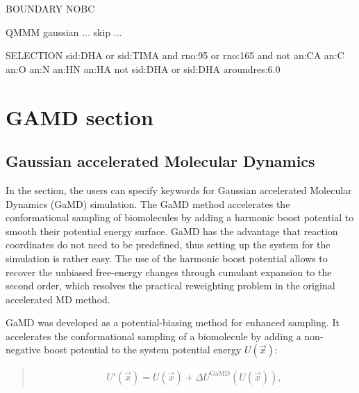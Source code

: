\documentclass[a4paper,11pt,oneside,english]{sphinxmanual}
\begin{document}
\begin{sphinxVerbatim}[commandchars=\\\{\}]
\PYG{o}{[}BOUNDARY\PYG{o}{]}
           NOBC

\PYG{o}{[}QMMM\PYG{o}{]}
               gaussian
  
... skip ...

\PYG{o}{[}SELECTION\PYG{o}{]}
  sid:DHA or sid:TIMA and rno:95 or rno:165 and 
         not an:CA  an:C  an:O  an:N  an:HN  an:HA
  not sid:DHA  or sid:DHA  around\PYGZus{}res:6.0
\end{sphinxVerbatim}


\chapter{GAMD section}
\label{\detokenize{16_GaMD:gamd-section}}\label{\detokenize{16_GaMD:gamd}}\label{\detokenize{16_GaMD::doc}}

\section{Gaussian accelerated Molecular Dynamics}
\label{\detokenize{16_GaMD:gaussian-accelerated-molecular-dynamics}}
In the \sphinxstylestrong{{[}GAMD{]}} section, the users can specify keywords for Gaussian
accelerated Molecular Dynamics (GaMD) simulation.
The GaMD method
accelerates the conformational sampling of biomolecules by adding
a harmonic boost potential to smooth their potential energy surface.
GaMD has the advantage that reaction coordinates do not need to be predefined,
thus setting up the system for the simulation is rather easy.
The use of the harmonic boost potential allows to recover the
unbiased free-energy changes through cumulant expansion to the second order,
which resolves the practical reweighting problem in the original accelerated MD method.

GaMD was developed as a potential-biasing method for enhanced sampling.
It accelerates the conformational sampling of a biomolecule by adding a
non-negative boost potential to the system potential energy \(U(\vec{x})\):
\begin{quote}

\vspace{-5mm}
\begin{equation*}
\begin{split}U'(\vec{x}) = U(\vec{x}) + \Delta U^{\mathrm{GaMD}}\left(U(\vec{x})\right),\end{split}
\end{equation*}
\vspace{-3mm}
\end{quote}
\end{document}
